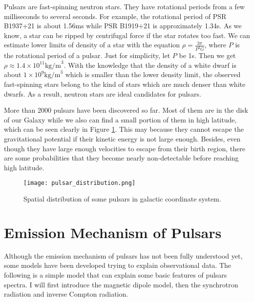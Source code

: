 \documentclass[a4paper, 12pt]{report}
\begin{document}
    Pulsars are fast-spinning neutron stars. They have rotational periods from a few 
    milliseconds to several seconds. For example, the rotational period of PSR B1937+21 is 
    about 1.56ms while PSR B1919+21 is approximately 1.34s. As we know, a star can be ripped 
    by centrifugal force if the star rotates too fast. We can estimate lower limits of 
    density of a star with the equation $\rho=\frac{3\pi}{P^2G}$, where $P$ is the 
    rotational period of a pulsar. Just for simplicity, let $P$ be 1s. Then we 
    get $\rho\approx 1.4\times 10^{11}\mbox{kg/m}^3$. With the knowledge that the 
    density of a white dwarf is about $1\times 10^9\mbox{kg/m}^3$ which is smaller than 
    the lower density limit, the observed fast-spinning stars belong to the kind of stars 
    which are much denser than white dwarfs. As a result, neutron stars are ideal candidates 
    for pulsars. 
    
    More than 2000 pulsars have been discovered so far. Most of them are in the disk of 
    our Galaxy while we also can find a small portion of them in high latitude, which can be 
    seen clearly in Figure \ref{fig: spatial_distribution}. This may 
    because they cannot escape the gravitational potential if their kinetic energy is not 
    large enough. Besides, even though they have large enough velocities to escape from their 
    birth region, there are some probabilities that they become nearly non-detectable before 
    reaching high latitude. 

    \begin{figure}[!htp]
      \centering
      \texttt{[image: pulsar\_distribution.png]}
      \caption{Spatial distribution of some pulsars in galactic coordinate system.}
      \label{fig: spatial_distribution}
    \end{figure}

    
  \section{Emission Mechanism of Pulsars}
    Although the emission mechanism of pulsars has not been fully understood yet, some 
    models have been developed 
    trying to explain observational data. The following is a simple model that can explain 
    some basic features of pulsars spectra. I will first introduce the magnetic dipole model, 
    then the synchrotron radiation and inverse Compton radiation. 
\end{document}

